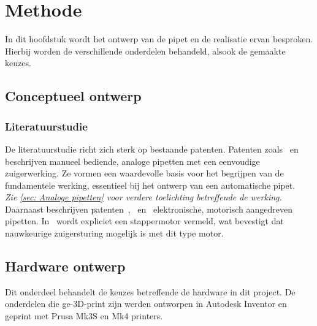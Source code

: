 \chapter{Methode}
In dit hoofdstuk wordt het ontwerp van de pipet en de realisatie ervan besproken. Hierbij worden de verschillende onderdelen behandeld, alsook de gemaakte keuzes.

\section{Conceptueel ontwerp}
\subsection{Literatuurstudie}
De literatuurstudie richt zich sterk op bestaande patenten. Patenten zoals\ \cite{RN17} en\ \cite{RN16} beschrijven manueel bediende, analoge pipetten met een eenvoudige zuigerwerking. Ze vormen een waardevolle basis voor het begrijpen van de fundamentele werking, essentieel bij het ontwerp van een automatische pipet.
\\\textit{Zie \autoref{sec: Analoge pipetten} voor verdere toelichting betreffende de werking.}
\\[12pt]Daarnaast beschrijven patenten\ \cite{RN35},\ \cite{RN36} en\ \cite{RN38} elektronische, motorisch aangedreven pipetten. In\ \cite{RN35} wordt expliciet een stappermotor vermeld, wat bevestigt dat nauwkeurige zuigersturing mogelijk is met dit type motor.

\section{Hardware ontwerp}
Dit onderdeel behandelt de keuzes betreffende de hardware in dit project. De onderdelen die ge-3D-print zijn werden ontworpen in Autodesk Inventor en geprint met Prusa Mk3S en Mk4 printers.

